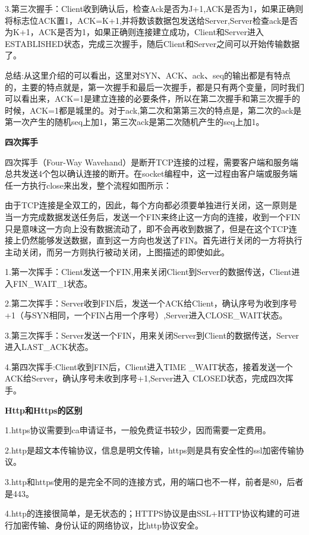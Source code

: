 \documentclass[UTF8]{ctexart}
\begin{document}
3.第三次握手：Client收到确认后，检查Ack是否为J+1,ACK是否为1，如果正确则将标志位ACK置1，ACK=K+1,并将数该数据包发送给Server,Server检查ack是否为K+1，ACK是否为1，如果正确则连接建立成功，Client和Server进入ESTABLISHED状态，完成三次握手，随后Client和Server之间可以开始传输数据了。

总结:从这里介绍的可以看出，这里对SYN、ACK、ack、seq的输出都是有特点的，主要的特点就是，第一次握手和最后一次握手，都是只有两个变量，同时我们可以看出来，ACK=1是建立连接的必要条件，所以在第二次握手和第三次握手的时候，ACK=1都是城里的。对于ack,第二次和第第三次的特点是，第二次的ack是第一次产生的随机seq上加1，第三次ack是第二次随机产生的seq上加1。

\textbf{四次挥手}

四次挥手（Four-Way Wavehand）是断开TCP连接的过程，需要客户端和服务端总共发送4个包以确认连接的断开。在socket编程中，这一过程由客户端或服务端任一方执行close来出发，整个流程如图所示：




由于TCP连接是全双工的，因此，每个方向都必须要单独进行关闭，这一原则是当一方完成数据发送任务后，发送一个FIN来终止这一方向的连接，收到一个FIN只是意味这一方向上没有数据流动了，即不会再收到数据了，但是在这个TCP连接上仍然能够发送数据，直到这一方向也发送了FIN。首先进行关闭的一方将执行主动关闭，而另一方则执行被动关闭，上图描述的即使如此。

1.第一次挥手：Client发送一个FIN,用来关闭Client到Server的数据传送，Client进入FIN\_WAIT\_1状态。

2.第二次挥手：Server收到FIN后，发送一个ACK给Client，确认序号为收到序号+1（与SYN相同，一个FIN占用一个序号）,Server进入CLOSE\_WAIT状态。

3.第三次挥手：Server发送一个FIN，用来关闭Server到Client的数据传送，Server进入LAST\_ACK状态。

4.第四次挥手:Client收到FIN后，Client进入TIME \_WAIT状态，接着发送一个ACK给Server，确认序号未收到序号+1,Server进入
CLOSED状态，完成四次挥手。


\textbf{Http和Https的区别}

1.https协议需要到ca申请证书，一般免费证书较少，因而需要一定费用。

2.http是超文本传输协议，信息是明文传输，https则是具有安全性的ssl加密传输协议。

3.http和https使用的是完全不同的连接方式，用的端口也不一样，前者是80，后者是443。

4.http的连接很简单，是无状态的；HTTPS协议是由SSL+HTTP协议构建的可进行加密传输、身份认证的网络协议，比http协议安全。
\end{document}
